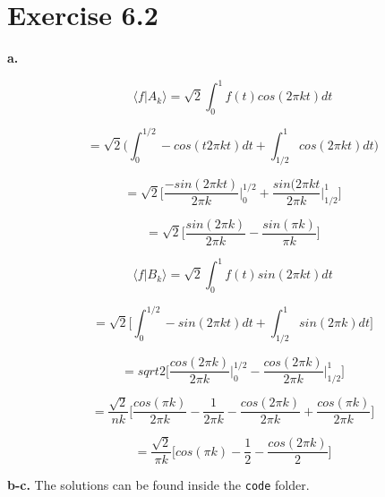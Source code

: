\documentclass[12pt]{article}
\begin{document}
	\section*{Exercise 6.2}
	
	\textbf{a.}
	
	$$\langle f | A_k \rangle = \sqrt{2}\int_{0}^{1} f(t)cos(2 \pi k t) dt$$ 
	
	$$ = \sqrt{2} \Bigg(\int_0^{1/2} -cos \left(t2 \pi k t\right)dt + \int_{1/2}^{1} cos \left(2 \pi k t\right) dt \Bigg) $$
	
	$$ = \sqrt{2} \Bigg[ \frac{-sin(2\pi k t)}{2 \pi k} \Bigg|^{1/2}_{0} + \frac{sin( 2 \pi k t}{2 \pi k} \Bigg|^{1}_{1/2} \bigg]$$
	
	$$ = \sqrt{2}\Bigg[ \frac{sin(2 \pi k)}{2 \pi k} - \frac{sin(\pi k)}{ \pi k} \Bigg]$$
	
	$$\langle f | B_k \rangle = \sqrt{2}\int_{0}^{1} f(t)sin(2 \pi k t) dt$$ 
	
	$$ = \sqrt{2} \Bigg[ \int^{1/2}_{0} -sin(2 \pi k t)dt + \int^{1}_{1/2}sin(2 \pi k)dt \Bigg] $$
	
	$$= sqrt{2} \Bigg[ \frac{cos(2 \pi k)}{2 \pi k} \Bigg|^{1/2}_{0} - \frac{cos(2 \pi k)}{2 \pi k}\Bigg|^{1}_{1/2} \Bigg]  $$
	
	$$ = \frac{\sqrt{2}}{n k} \Bigg[ \frac{cos(\pi k)}{2 \pi k} - \frac{1}{2 \pi k} - \frac{cos(2 \pi k)}{2 \pi k} + \frac{cos( \pi k) }{ 2 \pi k}  \Bigg]$$
	
	$$= \frac{\sqrt{2}}{\pi k} \Bigg[ cos(\pi k) - \frac{1}{2} - \frac{cos(2 \pi k)}{2}\Bigg]$$

	\textbf{b-c.} The solutions can be found inside the \texttt{code} folder.
\end{document}
